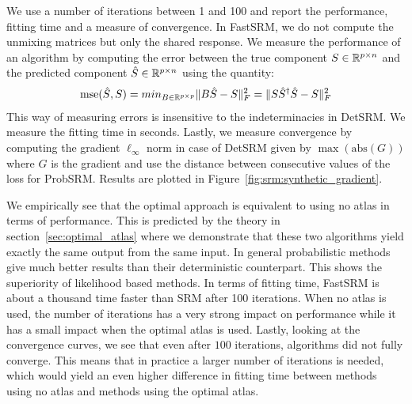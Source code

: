 \documentclass{article}
\begin{document}
We use a number of iterations between 1 and 100 and report the performance,
fitting time and a measure of convergence.
%
In FastSRM, we do not compute the
unmixing matrices but only the shared response.
%
We measure the performance of an algorithm by computing the error between the true component $S \in \mathbb{R}^{p \times n}$ and
the predicted component $\hat{S} \in \mathbb{R}^{p \times n}$ using the quantity:
\begin{align}
\mathrm{mse}(\hat{S}, S) = min_{B \in \mathbb{R}^{p \times p}} \|B \hat{S} - S \|^2_F =  \|S
\hat{S}^{\dagger}\hat{S} - S \|^2_F
\end{align}
%
This way of measuring errors is
insensitive to the indeterminacies in DetSRM.
%
We measure the fitting time in seconds.
%
Lastly, we measure convergence by computing the gradient $\ell_{\infty}$ norm in
case of DetSRM given by $\max(\mathrm{abs}(G))$ where $G$ is the gradient and
use the distance between consecutive values of the loss for ProbSRM.
%
Results are plotted in Figure~\ref{fig:srm:synthetic_gradient}.
%

We empirically see that the optimal approach is equivalent to using no atlas in
terms of performance.
%
This is predicted by the theory in section~\ref{sec:optimal_atlas} where we demonstrate that these two algorithms yield exactly the same output
from the same input.
%
%
In general probabilistic methods give much better results than their deterministic
counterpart.
%
This shows the superiority of likelihood based methods.
%
In terms of fitting time, FastSRM is about a thousand time faster than SRM after
100 iterations.
%
When no atlas is used, the number
of iterations has a very strong impact on performance while it has a small impact
when the optimal atlas is used.
%
Lastly, looking at the convergence curves, we see that even after $100$ iterations, algorithms did
not fully converge.
%
This means that in practice a larger number of
iterations is needed, which would yield an even higher difference in fitting time
between methods using no atlas and methods using the optimal atlas.
%
\end{document}
